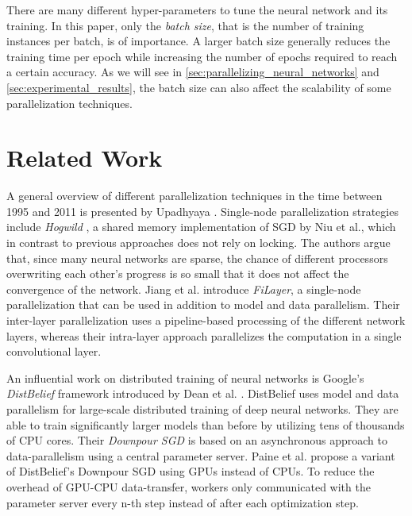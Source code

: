 \documentclass[conference,compsoc,a4paper]{IEEEtran}
\begin{document}
There are many different hyper-parameters to tune the neural network and its training.
In this paper, only the \emph{batch size}, that is the number of training instances per batch, is of importance.
A larger batch size generally reduces the training time per epoch while increasing the number of epochs required to reach a certain accuracy.
As we will see in \autoref{sec:parallelizing_neural_networks} and \ref{sec:experimental_results}, the batch size can also affect the scalability of some parallelization techniques.



\section{Related Work} %
\label{sec:related_work}
A general overview of different parallelization techniques in the time between 1995 and 2011 is presented by Upadhyaya \cite{upadhyaya2013parallel}.
%
Single-node parallelization strategies include \emph{Hogwild} \cite{recht2011-Hogwild}, a shared memory implementation of SGD by Niu et al., which in contrast to previous approaches does not rely on locking.
The authors argue that, since many neural networks are sparse, the chance of different processors overwriting each other's progress is so small that it does not affect the convergence of the network.
%
Jiang et al. \cite{jiang2018-FiLayer} introduce \emph{FiLayer}, a single-node parallelization that can be used in addition to model and data parallelism.
Their inter-layer parallelization uses a pipeline-based processing of the different network layers, whereas their intra-layer approach parallelizes the computation in a single convolutional layer.

An influential work on distributed training of neural networks is Google’s \emph{DistBelief} framework introduced by Dean et al. \cite{dean2012-Large-scale-distributed}.
DistBelief uses model and data parallelism for large-scale distributed training of deep neural networks.
They are able to train significantly larger models than before by utilizing tens of thousands of CPU cores.
Their \emph{Downpour SGD} is based on an asynchronous approach to data-parallelism using a central parameter server.
%
Paine et al. \cite{paine2013-GPU-async-SGD} propose a variant of DistBelief's Downpour SGD using GPUs instead of CPUs.
To reduce the overhead of GPU-CPU data-transfer, workers only communicated with the parameter server every n-th step instead of after each optimization step.
\end{document}
